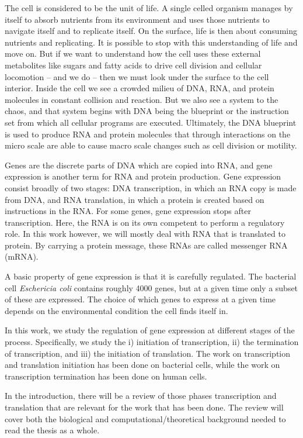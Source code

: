 %

The cell is considered to be the unit of life. A single celled organism manages
by itself to absorb nutrients from its environment and uses those nutrients to
navigate itself and to replicate itself. On the surface, life is then about
consuming nutrients and replicating. It is possible to stop with this
understanding of life and move on. But if we want to understand how the cell
uses these external metabolites like sugars and fatty acids to drive cell
division and cellular locomotion -- and we do -- then we must look under the
surface to the cell interior. Inside the cell we see a crowded milieu of DNA,
RNA, and protein molecules in constant collision and reaction. But we also see
a system to the chaos, and that system begins with DNA being the blueprint or
the instruction set from which all cellular programs are executed. Ultimately,
the DNA blueprint is used to produce RNA and protein molecules that through
interactions on the micro scale are able to cause macro scale changes such as
cell division or motility.

Genes are the discrete parts of DNA which are copied into RNA, and gene
expression is another term for RNA and protein production. Gene expression
consist broadly of two stages: DNA transcription, in which an RNA copy is made
from DNA, and RNA translation, in which a protein is created based on
instructions in the RNA. For some genes, gene expression stops after
transcription. Here, the RNA is on its own competent to perform a regulatory
role. In this work however, we will mostly deal with RNA that is translated to
protein. By carrying a protein message, these RNAs are called messenger RNA
(mRNA).

A basic property of gene expression is that it is carefully regulated. The
bacterial cell \textit{Eschericia coli} contains roughly 4000 genes, but at a
given time only a subset of these are expressed. The choice of which genes to
express at a given time depends on the environmental condition the cell finds
itself in.

In this work, we study the regulation of gene expression at different stages of
the process. Specifically, we study the i) initiation of transcription, ii) the
termination of transcription, and iii) the initiation of translation. The work
on transcription and translation initiation has been done on bacterial cells,
while the work on transcription termination has been done on human cells.

In the introduction, there will be a review of those phases transcription and
translation that are relevant for the work that has been done. The review will
cover both the biological and computational/theoretical background needed to
read the thesis as a whole.
